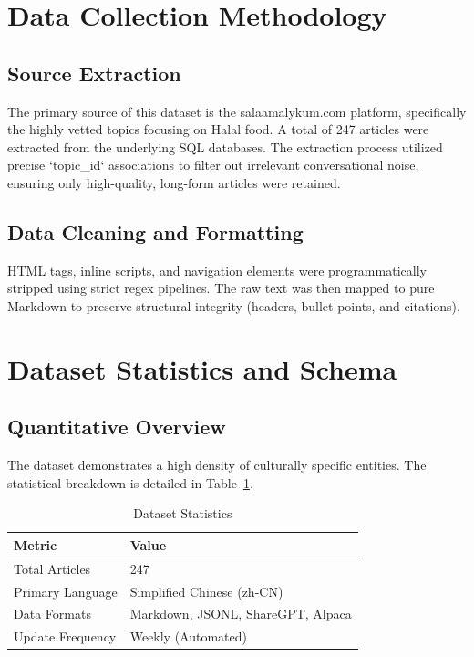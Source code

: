 \documentclass[11pt,a4paper]{article}
\begin{document}
\section{Data Collection Methodology}
\subsection{Source Extraction}
The primary source of this dataset is the salaamalykum.com platform, specifically the highly vetted topics focusing on Halal food. A total of 247 articles were extracted from the underlying SQL databases. The extraction process utilized precise `topic_id` associations to filter out irrelevant conversational noise, ensuring only high-quality, long-form articles were retained.

\subsection{Data Cleaning and Formatting}
HTML tags, inline scripts, and navigation elements were programmatically stripped using strict regex pipelines. The raw text was then mapped to pure Markdown to preserve structural integrity (headers, bullet points, and citations).

\section{Dataset Statistics and Schema}
\subsection{Quantitative Overview}
The dataset demonstrates a high density of culturally specific entities. The statistical breakdown is detailed in Table~\ref{tab:stats}.

\begin{table}[H]
    \centering
    \begin{tabular}{ll}
        \toprule
        \textbf{Metric} & \textbf{Value} \\
        \midrule
        Total Articles & 247 \\
        Primary Language & Simplified Chinese (zh-CN) \\
        Data Formats & Markdown, JSONL, ShareGPT, Alpaca \\
        Update Frequency & Weekly (Automated) \\
        \bottomrule
    \end{tabular}
    \caption{Dataset Statistics}
    \label{tab:stats}
\end{table}
\end{document}
